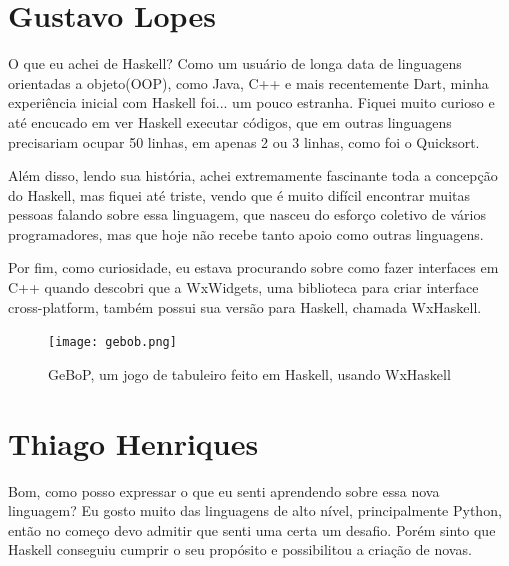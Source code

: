\documentclass[
  article,			       %
  12pt,				         %
  oneside,			       %
  a4paper,			       %
  english,		       	 %
  brazil,			      	 %
  sumario=tradicional
]{abntex2}
\begin{document}
    
    \begin{apendicesenv}
      
        \partapendices

        \setcounter{chapter}{0}
        \renewcommand{\thechapter}{\Alph{chapter}}%

        \chapter{Gustavo Lopes}

        O que eu achei de Haskell? Como um usuário de longa data de linguagens orientadas a objeto(OOP), 
        como Java, C++ e mais recentemente Dart, minha experiência inicial com Haskell foi...
        um pouco estranha. Fiquei muito curioso e até encucado em ver Haskell executar códigos, que em
        outras linguagens precisariam ocupar 50 linhas, em apenas 2 ou 3 linhas, como foi o Quicksort.

        Além disso, lendo sua história, achei extremamente fascinante toda a concepção do Haskell,
        mas fiquei até triste, vendo que é muito difícil encontrar muitas pessoas falando sobre essa linguagem, que nasceu 
        do esforço coletivo de vários programadores, mas que hoje não recebe tanto apoio como outras linguagens.

        Por fim, como curiosidade, eu estava procurando sobre como fazer interfaces em C++ quando
        descobri que a WxWidgets, uma biblioteca para criar interface cross-platform, também possui 
        sua versão para Haskell, chamada WxHaskell.

        \begin{figure}[ht]
          \texttt{[image: gebob.png]}
          \caption{GeBoP, um jogo de tabuleiro feito em Haskell, usando WxHaskell}
        \end{figure}

        \newpage
        
        \chapter{Thiago Henriques}

        Bom, como posso expressar o que eu senti aprendendo sobre essa nova linguagem? Eu gosto muito das linguagens de alto nível, principalmente Python,
        então no começo devo admitir que senti uma certa um desafio. Porém sinto que Haskell conseguiu cumprir o 
        seu propósito e possibilitou a criação de novas.


\end{apendicesenv}
\end{document}
